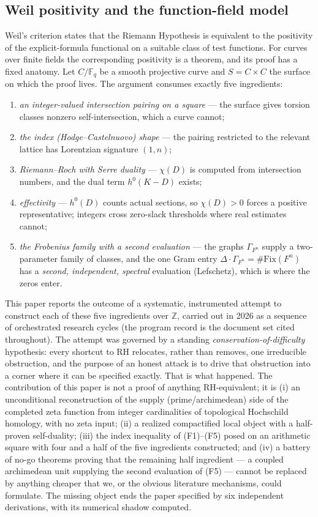 \documentclass[11pt,reqno]{amsart}
\theoremstyle{plain}
\theoremstyle{definition}
\theoremstyle{remark}
\newcommand{\Z}{\mathbb{Z}}
\newcommand{\F}{\mathbb{F}}
\begin{document}
\subsection{Weil positivity and the function-field model}

Weil's criterion \cite{Weil52,Bombieri00,Yoshida92} states that the Riemann Hypothesis is
equivalent to the positivity of the explicit-formula functional on a suitable class of test
functions. For curves over finite fields the corresponding positivity is a theorem, and its
proof has a fixed anatomy. Let $C/\F_q$ be a smooth projective curve and $S = C \times C$ the
surface on which the proof lives. The argument consumes exactly five ingredients:
\begin{enumerate}
\item[(F1)] \emph{an integer-valued intersection pairing on a square} --- the surface gives
torsion classes nonzero self-intersection, which a curve cannot;
\item[(F2)] \emph{the index (Hodge--Castelnuovo) shape} --- the pairing restricted to the
relevant lattice has Lorentzian signature $(1, n)$;
\item[(F3)] \emph{Riemann--Roch with Serre duality} --- $\chi(D)$ is computed from intersection
numbers, and the dual term $h^0(K - D)$ exists;
\item[(F4)] \emph{effectivity} --- $h^0(D)$ counts actual sections, so $\chi(D) > 0$ forces a
positive representative; integers cross zero-slack thresholds where real estimates cannot;
\item[(F5)] \emph{the Frobenius family with a second evaluation} --- the graphs
$\Gamma_{F^n}$ supply a two-parameter family of classes, and the one Gram entry
$\Delta \cdot \Gamma_{F^n} = \#\mathrm{Fix}(F^n)$ has a \emph{second, independent, spectral}
evaluation (Lefschetz), which is where the zeros enter.
\end{enumerate}
This paper reports the outcome of a systematic, instrumented attempt to construct each of
these five ingredients over $\Z$, carried out in 2026 as a sequence of orchestrated research
cycles (the program record is the document set cited throughout). The attempt was governed by
a standing \emph{conservation-of-difficulty} hypothesis: every shortcut to RH relocates,
rather than removes, one irreducible obstruction, and the purpose of an honest attack is to
drive that obstruction into a corner where it can be specified exactly. That is what
happened. The contribution of this paper is not a proof of anything RH-equivalent; it is
(i) an unconditional reconstruction of the supply (prime/archimedean) side of the completed
zeta function from integer cardinalities of topological Hochschild homology, with no zeta
input; (ii) a realized compactified local object with a half-proven self-duality; (iii) the
index inequality of (F1)--(F5) posed on an arithmetic square with four and a half of the five
ingredients constructed; and (iv) a battery of no-go theorems proving that the remaining half
ingredient --- a coupled archimedean unit supplying the second evaluation of (F5) --- cannot
be replaced by anything cheaper that we, or the obvious literature mechanisms, could
formulate. The missing object ends the paper specified by six independent derivations, with
its numerical shadow computed.
\end{document}
